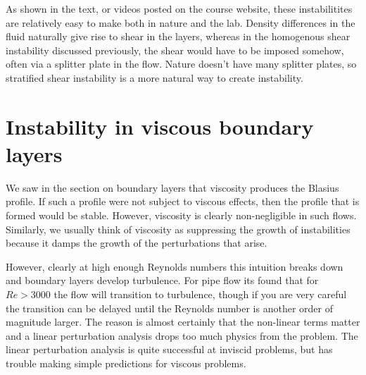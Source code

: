 \documentclass[11pt]{article}
\begin{document}
As shown in the text, or videos posted on the course website, these
instabilitites are relatively easy to make both in nature and the lab.  Density
differences in the fluid naturally give rise to shear in the layers, whereas in
the homogenous shear instability discussed previously, the shear would have to
be imposed somehow, often via a splitter plate in the flow.  Nature doesn't
have many splitter plates, so stratified shear instability is a more natural
way to create instability.  

\section{Instability in viscous boundary layers}

We saw in the section on boundary layers that viscosity produces the Blasius
profile.  If such a profile were not subject to viscous effects, then the
profile that is formed would be stable.  However, viscosity is clearly
non-negligible in such flows.  Similarly, we usually think of viscosity as
suppressing the growth of instabilities because it damps the growth of the
perturbations that arise.

However, clearly at high enough Reynolds numbers this intuition breaks down and
boundary layers develop turbulence.  For pipe flow its found that for $Re>3000$
the flow will transition to turbulence, though if you are very careful the
transition can be delayed until the Reynolds number is another order of
magnitude larger.  The reason is almost certainly that the non-linear terms
matter and a linear perturbation analysis drops too much physics from the
problem.   The linear perturbation analysis is quite successful at inviscid
problems, but has trouble making simple predictions for viscous problems.
\end{document}
